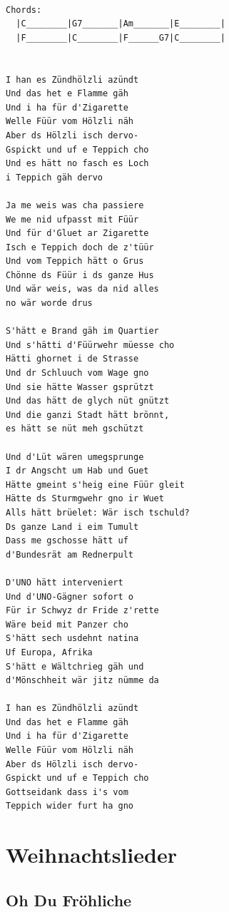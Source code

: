 \documentclass[
]{book}
\let\stdsection\section
\renewcommand\section{\clearpage\stdsection}
\begin{document}
\begin{verbatim}

Chords:
  |C________|G7_______|Am_______|E________|
  |F________|C________|F______G7|C________|


I han es Zündhölzli azündt
Und das het e Flamme gäh
Und i ha für d'Zigarette
Welle Füür vom Hölzli näh
Aber ds Hölzli isch dervo-
Gspickt und uf e Teppich cho
Und es hätt no fasch es Loch 
i Teppich gäh dervo

Ja me weis was cha passiere
We me nid ufpasst mit Füür
Und für d'Gluet ar Zigarette
Isch e Teppich doch de z'tüür
Und vom Teppich hätt o Grus
Chönne ds Füür i ds ganze Hus
Und wär weis, was da nid alles 
no wär worde drus

S'hätt e Brand gäh im Quartier
Und s'hätti d'Füürwehr müesse cho
Hätti ghornet i de Strasse
Und dr Schluuch vom Wage gno
Und sie hätte Wasser gsprützt
Und das hätt de glych nüt gnützt
Und die ganzi Stadt hätt brönnt, 
es hätt se nüt meh gschützt

Und d'Lüt wären umegsprunge
I dr Angscht um Hab und Guet
Hätte gmeint s'heig eine Füür gleit
Hätte ds Sturmgwehr gno ir Wuet
Alls hätt brüelet: Wär isch tschuld?
Ds ganze Land i eim Tumult
Dass me gschosse hätt uf 
d'Bundesrät am Rednerpult

D'UNO hätt interveniert
Und d'UNO-Gägner sofort o
Für ir Schwyz dr Fride z'rette
Wäre beid mit Panzer cho
S'hätt sech usdehnt natina
Uf Europa, Afrika
S'hätt e Wältchrieg gäh und 
d'Mönschheit wär jitz nümme da

I han es Zündhölzli azündt
Und das het e Flamme gäh
Und i ha für d'Zigarette
Welle Füür vom Hölzli näh
Aber ds Hölzli isch dervo-
Gspickt und uf e Teppich cho 
Gottseidank dass i's vom 
Teppich wider furt ha gno
\end{verbatim}

\hypertarget{weihnachtslieder}{%
\chapter{Weihnachtslieder}\label{weihnachtslieder}}

\hypertarget{oh-du-fruxf6hliche}{%
\section{Oh Du Fröhliche}\label{oh-du-fruxf6hliche}}
\end{document}
